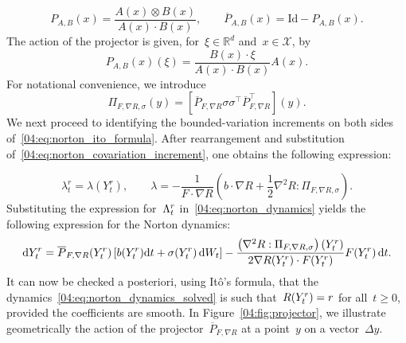 \begin{equation}
    \label{04:eq:norton_proj_AB}
    P_{A,B}(x) = \frac{A(x) \otimes B(x)}{A(x) \cdot B(x)},\qquad \overline{P}_{A,B}(x)=\mathrm{Id}-P_{A,B}(x).
\end{equation}
The action of the projector is given, for~$\xi\in \mathbb{R}^d$ and~$x\in\mathcal{X}$, by
\[P_{A,B}(x)(\xi)=\frac{B(x)\cdot \xi}{A(x)\cdot B(x)}A(x).\]
For notational convenience, we introduce
\begin{equation}
    \label{04:eq:norton_covariation_projector_term}
    \Pi_{F,\nabla R,\sigma}(y)=\left[\overline{P}_{F,\nabla R} \sigma\sigma ^\intercal \overline{P}_{ F,\nabla R}^\intercal\right](y).
\end{equation}
We next proceed to identifying the bounded-variation increments on both sides of~\eqref{04:eq:norton_ito_formula}. After rearrangement and substitution of~\eqref{04:eq:norton_covariation_increment}, one obtains the following expression:

\begin{equation}
    \label{04:eq:norton_lambda_expr}
    \lambda_t^r =\lambda(Y_t^r),\qquad\lambda = -\frac1{F\cdot \nabla R}\left(b\cdot \nabla R +\frac12 \nabla^2 R:\Pi_{F,\nabla R,\sigma}\right).
\end{equation}
Substituting the expression for~$\Lambda^r_t $ in~\eqref{04:eq:norton_dynamics} yields the following expression for the Norton dynamics:
\begin{equation}
    \label{04:eq:norton_dynamics_solved}
    \mathrm{d} Y^r_t = \overline{P}_{F,\nabla R}(Y^r_t)\left[b(Y^r_t) \mathrm{d} t + \sigma(Y^r_t)\, \mathrm{d} W_t\right]
    -\frac{\left(\nabla^2 R:\Pi_{F,\nabla R,\sigma}\right)(Y^r_t)}{2\nabla R(Y^r_t)\cdot F(Y^r_t)}F(Y^r_t)\,\mathrm{d} t.
\end{equation}
It can now be checked a posteriori, using Itô's formula, that the dynamics~\eqref{04:eq:norton_dynamics_solved} is such that~$R(Y^r_t)=r$ for all~$t\geq 0$, provided the coefficients are smooth. In Figure~\ref{04:fig:projector}, we illustrate geometrically the action of the projector~$\overline{P}_{F,\nabla R}$ at a point~$y$ on a vector~$\Delta y$.


